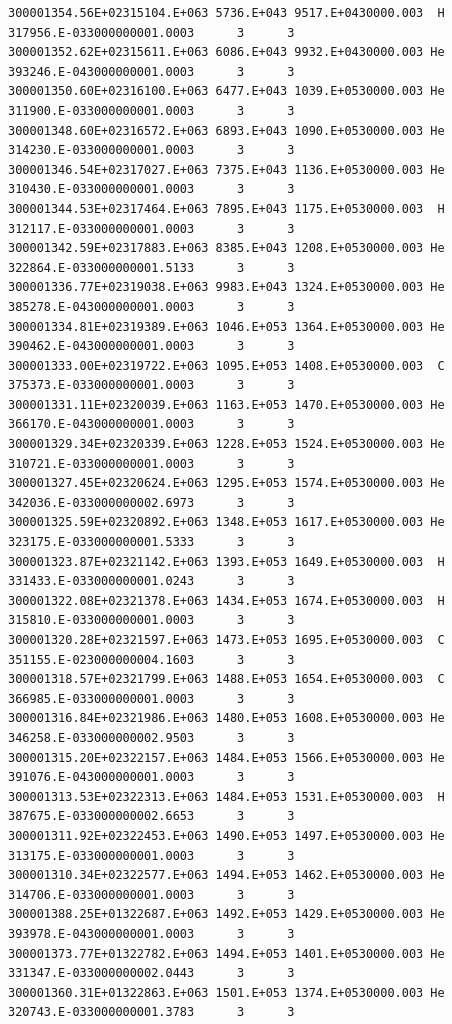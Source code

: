 \documentclass [11pt,a4paper,dvipdfmx] {jarticle}
\begin{document}
\begin{lstlisting}[caption={COLLISION.txtの例。1イベントのみ抽出。},basicstyle=\fontsize{6}{6}\ttfamily,identifierstyle=\fontsize{6}{6},numberstyle={\tiny},columns=fixed]
300001354.56E+02315104.E+063 5736.E+043 9517.E+0430000.003  H 317956.E-033000000001.0003      3      3
300001352.62E+02315611.E+063 6086.E+043 9932.E+0430000.003 He 393246.E-043000000001.0003      3      3
300001350.60E+02316100.E+063 6477.E+043 1039.E+0530000.003 He 311900.E-033000000001.0003      3      3
300001348.60E+02316572.E+063 6893.E+043 1090.E+0530000.003 He 314230.E-033000000001.0003      3      3
300001346.54E+02317027.E+063 7375.E+043 1136.E+0530000.003 He 310430.E-033000000001.0003      3      3
300001344.53E+02317464.E+063 7895.E+043 1175.E+0530000.003  H 312117.E-033000000001.0003      3      3
300001342.59E+02317883.E+063 8385.E+043 1208.E+0530000.003 He 322864.E-033000000001.5133      3      3
300001336.77E+02319038.E+063 9983.E+043 1324.E+0530000.003 He 385278.E-043000000001.0003      3      3
300001334.81E+02319389.E+063 1046.E+053 1364.E+0530000.003 He 390462.E-043000000001.0003      3      3
300001333.00E+02319722.E+063 1095.E+053 1408.E+0530000.003  C 375373.E-033000000001.0003      3      3
300001331.11E+02320039.E+063 1163.E+053 1470.E+0530000.003 He 366170.E-043000000001.0003      3      3
300001329.34E+02320339.E+063 1228.E+053 1524.E+0530000.003 He 310721.E-033000000001.0003      3      3
300001327.45E+02320624.E+063 1295.E+053 1574.E+0530000.003 He 342036.E-033000000002.6973      3      3
300001325.59E+02320892.E+063 1348.E+053 1617.E+0530000.003 He 323175.E-033000000001.5333      3      3
300001323.87E+02321142.E+063 1393.E+053 1649.E+0530000.003  H 331433.E-033000000001.0243      3      3
300001322.08E+02321378.E+063 1434.E+053 1674.E+0530000.003  H 315810.E-033000000001.0003      3      3
300001320.28E+02321597.E+063 1473.E+053 1695.E+0530000.003  C 351155.E-023000000004.1603      3      3
300001318.57E+02321799.E+063 1488.E+053 1654.E+0530000.003  C 366985.E-033000000001.0003      3      3
300001316.84E+02321986.E+063 1480.E+053 1608.E+0530000.003 He 346258.E-033000000002.9503      3      3
300001315.20E+02322157.E+063 1484.E+053 1566.E+0530000.003 He 391076.E-043000000001.0003      3      3
300001313.53E+02322313.E+063 1484.E+053 1531.E+0530000.003  H 387675.E-033000000002.6653      3      3
300001311.92E+02322453.E+063 1490.E+053 1497.E+0530000.003 He 313175.E-033000000001.0003      3      3
300001310.34E+02322577.E+063 1494.E+053 1462.E+0530000.003 He 314706.E-033000000001.0003      3      3
300001388.25E+01322687.E+063 1492.E+053 1429.E+0530000.003 He 393978.E-043000000001.0003      3      3
300001373.77E+01322782.E+063 1494.E+053 1401.E+0530000.003 He 331347.E-033000000002.0443      3      3
300001360.31E+01322863.E+063 1501.E+053 1374.E+0530000.003 He 320743.E-033000000001.3783      3      3

\end{lstlisting}
\end{document}
